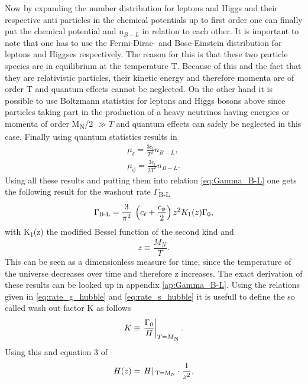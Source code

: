 Now by expanding the number distribution for leptons and Higgs and their respective anti particles in the chemical potentials up to first order one can finally put the chemical potential and n$_{B-L}$ in relation to each other. It is important to note that one has to use the Fermi-Dirac- and Bose-Einstein distribution for leptons and Higgses respectively. The reason for this is that these two particle species are in equilibrium at the temperature T. Because of this and the fact that they are relativistic particles, their kinetic energy and therefore momenta are of order T and quantum effects cannot be neglected. On the other hand it is possible to use Boltzmann statistics for leptons and Higgs bosons above since particles taking part in the production of a heavy neutrinos having energies or momenta of order M\textsubscript{N}/2 $\gg T$ and quantum effects can safely be neglected in this case. Finally using quantum statistics results in
\begin{align}
\mu_\ell=\frac{3c_l}{T^2}n_{B-L},
\label{eq:chempot_l}
\\
\mu_\phi=\frac{3c_l}{2T^2}n_{B-L}.
\label{eq:chempot_phi}
\end{align}
Using all these results and putting them into relation \eqref{eq:Gamma_B-L} one gets the following result for the washout rate $\Gamma$\textsubscript{B-L}
\begin{equation}
	\Gamma\textsubscript{B-L}=\frac{3}{\pi^2}\:\left(c_\ell+\frac{c_\phi}{2}\right)z^2K_1(z)\Gamma_0,
	\label{eq:Gamma_B-l_result}
\end{equation}
with K\textsubscript{1}(z) the modified Bessel function of the second kind and 
\begin{equation}
	z\equiv\frac{M_N}{T}.
\end{equation}
This can be seen as a dimensionless measure for time, since the temperature of the universe decreases over time and therefore z increases. 
The exact derivation of these results can be looked up in appendix \ref{ap:Gamma_B-L}. \newline\indent
Using the relations given in \eqref{eq:rate_g_hubble} and \eqref{eq:rate_s_hubble} it is usefull to define the so called wash out factor K as follows
\begin{equation}
	K\equiv\left.\frac{\Gamma_0}{H}\right|_{T=M\textsubscript{N}}.
	\label{eq:washout}
\end{equation}
Using this and equation 3 of \cite{Buchmuller:2004nz}
\begin{equation}
	H(z)=\left.H\right|\textsubscript{T=M\textsubscript{N}}\cdot \frac{1}{z^2},
	\label{eq:H_von_z}
\end{equation}
